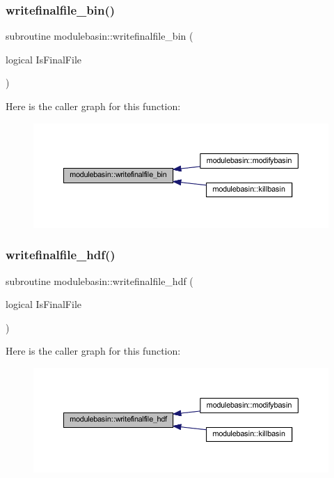 \subsubsection{\texorpdfstring{writefinalfile\+\_\+bin()}{writefinalfile\_bin()}}
{\footnotesize\ttfamily subroutine modulebasin\+::writefinalfile\+\_\+bin (\begin{DoxyParamCaption}\item[{logical}]{Is\+Final\+File }\end{DoxyParamCaption})\hspace{0.3cm}{\ttfamily [private]}}

Here is the caller graph for this function\+:\nopagebreak
\begin{figure}[H]
\begin{center}
\leavevmode
\includegraphics[width=350pt]{namespacemodulebasin_ab2ed3d304db416a0172609e73be05bd4_icgraph}
\end{center}
\end{figure}
\mbox{\label{namespacemodulebasin_af6daa86ceef2fea67fa23aaebaf588f1}} 
\subsubsection{\texorpdfstring{writefinalfile\+\_\+hdf()}{writefinalfile\_hdf()}}
{\footnotesize\ttfamily subroutine modulebasin\+::writefinalfile\+\_\+hdf (\begin{DoxyParamCaption}\item[{logical}]{Is\+Final\+File }\end{DoxyParamCaption})\hspace{0.3cm}{\ttfamily [private]}}

Here is the caller graph for this function\+:\nopagebreak
\begin{figure}[H]
\begin{center}
\leavevmode
\includegraphics[width=350pt]{namespacemodulebasin_af6daa86ceef2fea67fa23aaebaf588f1_icgraph}
\end{center}
\end{figure}


